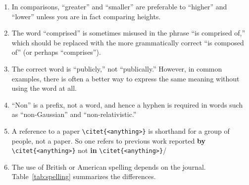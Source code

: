 \documentclass[letterpaper,11pt]{article}
\begin{document}
\begin{enumerate}
\item
In comparisons, ``greater'' and ``smaller'' are preferable to ``higher'' and ``lower'' unless you are
in fact comparing heights.

\item
The word ``comprised'' is sometimes misused in the phrase ``is comprised of,''
which should be replaced with the more grammatically correct
``is composed of'' (or perhaps ``comprises'').

\item
The correct word is ``publicly,'' not ``publically.''  However, in common
examples, there is often a better way to express the same meaning without
using the word at all.

\item
``Non'' is a prefix, not a word, and hence a hyphen is required in words such
as ``non-Gaussian'' and ``non-relativistic.''

\item
A reference to a paper \verb|\citet{<anything>}| is shorthand for a group of people, not a paper.  So one refers to previous work reported {\bf by} \verb|\citet{<anything>}| not {\bf in} \verb|\citet{<anything>}|/

\item
The use of British or American spelling depends on the journal.  Table~\ref{tab:spelling} summarizes the differences.

\end{enumerate}
\end{document}

